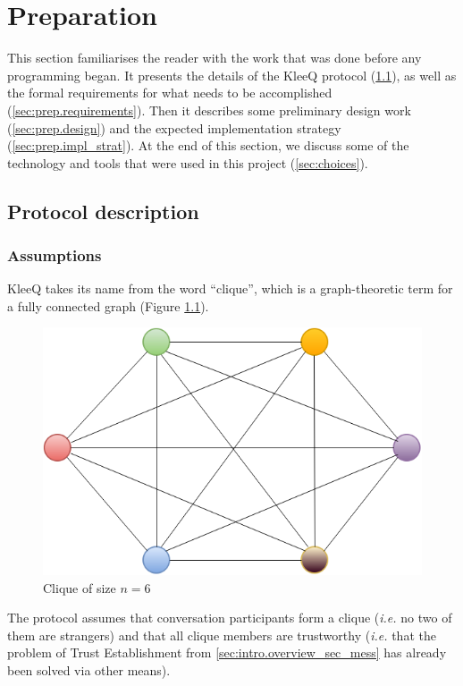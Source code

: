 \documentclass[a4paper, 12pt]{report}
\begin{document}
\chapter{Preparation}
\label{ch:prep}
This section familiarises the reader with the work that was done before any programming began. It presents the details of the KleeQ protocol (\cref{sec:prep.proto}), as well as the formal requirements for what needs to be accomplished (\cref{sec:prep.requirements}). Then it describes some preliminary design work (\cref{sec:prep.design}) and the expected implementation strategy (\cref{sec:prep.impl_strat}). At the end of this section, we discuss some of the technology and tools that were used in this project (\cref{sec:choices}).

\section{Protocol description}
\label{sec:prep.proto}

\subsection{Assumptions}
KleeQ takes its name from the word ``clique'', which is a graph-theoretic term for a fully connected graph (Figure \ref{fig:clique}).
\begin{figure}[h]
    \centering
    \includegraphics[scale = 0.5]{pics/clique.png}
    \caption{Clique of size $n = 6$ \label{fig:clique}}
\end{figure}
The protocol assumes that conversation participants form a clique (\textit{i.e.} no two of them are strangers) and that all clique members are trustworthy (\textit{i.e.} that the problem of Trust Establishment from \cref{sec:intro.overview_sec_mess} has already been solved via other means). 
\end{document}
